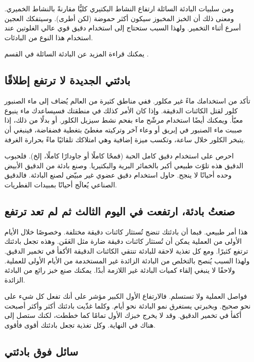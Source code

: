 ومن سلبيات البادئة السائلة ارتفاع النشاط البكتيري كليًّا مقارنةً بالنشاط الخميري. ومعنى ذلك أن الخبز المخبوز سيكون أكثر حموضة (لكن أطرى). وسيتفكك العجين أسرع أثناء التخمير. ولهذا السبب ستحتاج إلى استخدام دقيق قوي عالي الغلوتين عند استخدام هذا النوع من البادئات.

يمكنك قراءة المزيد عن البادئة السائلة في القسم .

\subsection{بادئتي الجديدة لا ترتفع إطلاقًا}

تأكد من استخدامك ماءً غير مكلور. ففي مناطق كثيرة من العالم يُضاف إلى ماء الصنبور كلور لقتل الكائنات الدقيقة. وإذا كان الأمر كذلك في منطقتك فسيساعدك ماء ينبوع معبّأ. ويمكنك أيضًا استخدام مرشّح ماء بفحم نشط سيزيل الكلور. أو بدلًا من ذلك، إذا صببت ماء الصنبور في إبريق أو وعاء آخر وتركيته مغطىً بتغطية فضفاضة، فينبغي أن يتبخر الكلور خلال  ساعة، وتكسب ميزة إضافية وهي امتلاكك تلقائيًا ماءً بحرارة الغرفة.

احرص على استخدام دقيق كامل الحبة (قمحًا كاملًا أو جاودارًا كاملًا، إلخ). فلحبوب الدقيق هذه تلوّث طبيعي أكبر بالخمائر البرية والبكتيريا. وصنع بادئة من الدقيق الأبيض وحده أحيانًا لا ينجح. حاول استخدام دقيق عضوي غير مبيّض لصنع البادئة. فالدقيق الصناعي يُعالَج أحيانًا بمبيدات الفطريات.

\subsection{صنعتُ بادئة، ارتفعت في اليوم الثالث ثم لم تعد ترتفع}

هذا أمر طبيعي. فبما أن بادئتك تنضج تُستثار كائنات دقيقة مختلفة. وخصوصًا خلال الأيام الأولى من العملية يمكن أن تُستثار كائنات دقيقة ضارة مثل العَفَن. وهذه تجعل بادئتك ترتفع كثيرًا. ومع كل تغذية لاحقة للبادئة تنتقي الكائنات الدقيقة الأكفأ في تخمير الدقيق. ولهذا السبب يُنصح بالتخلص من البادئة الزائدة غير المستخدمة من الأيام الأولى للعملية. ولاحقًا لا ينبغي إلقاء كميات البادئة غير اللازمة أبدًا. يمكنك صنع خبز رائع من البادئة الزائدة.

فواصل العملية ولا تستسلم. فالارتفاع الأول الكبير مؤشر على أنك تفعل كل شيء على نحو صحيح. وبخبرتي يستغرق نمو البادئة نحو  أيام. وكلما غذّيت بادئتك أكثر وأكثر أصبحت أكفأ في تخمير الدقيق. وقد لا يخرج خبزك الأول تمامًا كما خططت، لكنك ستصل إلى هناك في النهاية. وكل تغذية تجعل بادئتك أقوى فأقوى.

\subsection{سائل فوق بادئتي}

